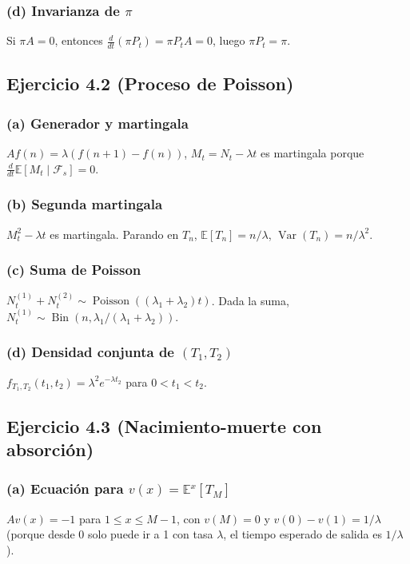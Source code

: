 \documentclass[12pt]{article}
\newcommand{\E}{\mathbb{E}}
\newcommand{\1}{\mathbf{1}}
\newcommand{\F}{\mathcal{F}}
\newcommand{\Var}{\operatorname{Var}}
\newcommand{\Bin}{\operatorname{Bin}}
\newcommand{\Poisson}{\operatorname{Poisson}}
\begin{document}
\subsubsection*{(d) Invarianza de $\pi$}
Si $\pi A=0$, entonces $\frac{d}{dt}(\pi P_t)=\pi P_t A=0$, luego $\pi P_t=\pi$.

\subsection{Ejercicio 4.2 (Proceso de Poisson)}

\subsubsection*{(a) Generador y martingala}
$Af(n)=\lambda(f(n+1)-f(n))$, $M_t=N_t-\lambda t$ es martingala porque $\frac{d}{dt}\E[M_t\mid\F_s]=0$.

\subsubsection*{(b) Segunda martingala}
$M_t^2-\lambda t$ es martingala. Parando en $T_n$, $\E[T_n]=n/\lambda$, $\Var(T_n)=n/\lambda^2$.

\subsubsection*{(c) Suma de Poisson}
$N_t^{(1)}+N_t^{(2)}\sim\Poisson((\lambda_1+\lambda_2)t)$. Dada la suma, $N_t^{(1)}\sim\Bin(n,\lambda_1/(\lambda_1+\lambda_2))$.

\subsubsection*{(d) Densidad conjunta de $(T_1,T_2)$}
$f_{T_1,T_2}(t_1,t_2)=\lambda^2 e^{-\lambda t_2}$ para $0<t_1<t_2$.

\subsection{Ejercicio 4.3 (Nacimiento-muerte con absorci\'on)}

\subsubsection*{(a) Ecuaci\'on para $v(x)=\E^x[T_M]$}
$Av(x)=-1$ para $1\le x\le M-1$, con $v(M)=0$ y $v(0)-v(1)=1/\lambda$ (porque desde 0 solo puede ir a 1 con tasa $\lambda$, el tiempo esperado de salida es $1/\lambda$).
\end{document}
